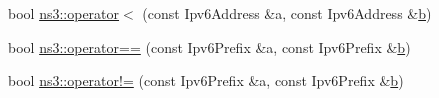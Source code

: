 \begin{DoxyCompactItemize}
\item 
bool \hyperlink{namespacens3_a8bb8053c70227e2384064125482d54ac}{ns3\+::operator$<$} (const Ipv6\+Address \&a, const Ipv6\+Address \&\hyperlink{lte__pathloss_8m_a21ad0bd836b90d08f4cf640b4c298e7c}{b})
\item 
bool \hyperlink{namespacens3_a0c3635bf2fc3a60c910357969da4e6a5}{ns3\+::operator==} (const Ipv6\+Prefix \&a, const Ipv6\+Prefix \&\hyperlink{lte__pathloss_8m_a21ad0bd836b90d08f4cf640b4c298e7c}{b})
\item 
bool \hyperlink{namespacens3_a37be4a3e4862d145dffa88a8b97fd5c7}{ns3\+::operator!=} (const Ipv6\+Prefix \&a, const Ipv6\+Prefix \&\hyperlink{lte__pathloss_8m_a21ad0bd836b90d08f4cf640b4c298e7c}{b})
\end{DoxyCompactItemize}
